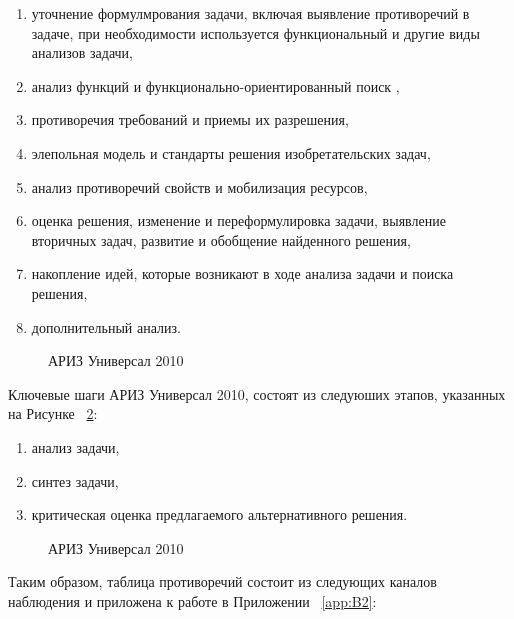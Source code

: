 \begin{enumerate}
	\item уточнение формулмрования задачи, включая выявление противоречий в задаче, при необходимости используется функциональный и другие виды анализов задачи,
	\item анализ функций и функционально-ориентированный поиск ,
	\item противоречия требований и приемы их разрешения,
	\item элепольная модель и стандарты решения изобретательских задач,
	\item анализ противоречий свойств и мобилизация ресурсов,
	\item оценка решения, изменение и переформулировка задачи, выявление вторичных задач, развитие и обобщение найденного решения,
	\item накопление идей, которые возникают в ходе анализа задачи и поиска решения,
	\item дополнительный анализ.
\end{enumerate}


\begin{figure}[ht]
    \caption{АРИЗ Универсал 2010}\label{fig:ariz-1}
\end{figure}

Ключевые шаги АРИЗ Универсал 2010, состоят из следуюших этапов, указанных на Рисунке ~\cref{fig:ariz-2}:

\begin{enumerate}
	\item анализ задачи,
	\item синтез задачи,
	\item критическая оценка предлагаемого альтернативного решения.
\end{enumerate} 


\begin{figure}[ht]
    \caption{АРИЗ Универсал 2010}\label{fig:ariz-2}
\end{figure}

Таким образом, таблица противоречий состоит из следующих каналов наблюдения и приложена к работе в Приложении ~\cref{app:B2}:

